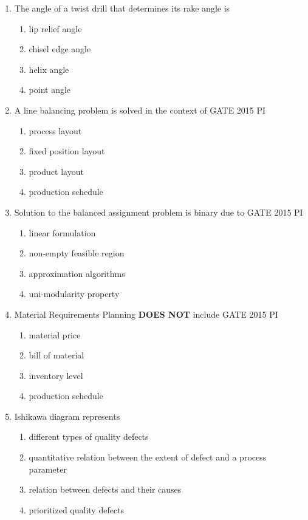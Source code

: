 \documentclass[journal,12pt,onecolumn]{IEEEtran}
\theoremstyle{remark}
\begin{document}
\begin{enumerate}
\item The angle of a twist drill that determines its rake angle is
\begin{enumerate}
    \item lip relief angle
    \item chisel edge angle
    \item helix angle
    \item point angle
\end{enumerate}
\item A line balancing problem is solved in the context of \hfill{GATE 2015 PI}
\begin{enumerate}
    \item process layout
    \item fixed position layout
    \item product layout
    \item production schedule
\end{enumerate}

\item Solution to the balanced assignment problem is binary due to \hfill{GATE 2015 PI}
\begin{enumerate}
    \item linear formulation
    \item non-empty feasible region
    \item approximation algorithms
    \item uni-modularity property
\end{enumerate}


\item Material Requirements Planning \textbf{DOES NOT} include \hfill{GATE 2015 PI}
\begin{enumerate}
    \item material price
    \item bill of material
    \item inventory level
    \item production schedule
\end{enumerate}

\item Ishikawa diagram represents
\begin{enumerate}
    \item different types of quality defects
    \item quantitative relation between the extent of defect and a process parameter
    \item relation between defects and their causes
    \item prioritized quality defects
\end{enumerate}


\end{enumerate}
\end{document}
